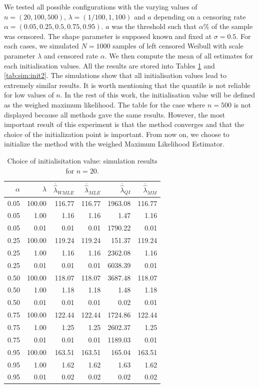 \begin{appendices}
     We tested all possible configurations with the varying values of $n = (20,100,500)$, $\lambda = (1/100,1,100)$ and $a$ depending on a censoring rate $\alpha = (0.05,0.25,0.5,0.75,0.95)$. $a$ was the threshold such that $\alpha \%$ of the sample was censored. The shape parameter is supposed known and fixed at $\sigma = 0.5$. For each cases, we simulated $N = 1000$ samples of left censored Weibull with scale parameter $\lambda$ and censored rate $\alpha$. We then compute the mean of all estimates for each initialisation values. All the results are stored into Tables \ref{tab:sim:init1} and \ref{tab:sim:init2}. The simulations show that all initialisation values lead to extremely similar results. It is worth mentioning that the quantile is not reliable for low values of $n$. In the rest of this work, the initialisation value will be defined as the weighed maximum likelihood. The table for the case where $n = 500$ is not displayed because all methods gave the same results. However, the most important result of this experiment is that the method converges and that the choice of the initialization point is important. From now on, we choose to initialize the method with the weighed Maximum Likelihood Estimator. 

\begin{table}[ht] 
\centering
\begin{tabular}{|rr||rrrr|}
 \hline
 $\alpha$ & $\lambda$ & $\overline{\hat\lambda}_{WMLE}$ & $\overline{\hat\lambda}_{MLE}$ & $\overline{\hat\lambda}_{QI}$ & $\overline{\hat\lambda}_{MM}$ \\
  \hline
  \hline
 0.05 & 100.00 & 116.77 & 116.77 & 1963.08 & 116.77 \\ 
   0.05 & 1.00 & 1.16 & 1.16 & 1.47 & 1.16 \\ 
   0.05 & 0.01 & 0.01 & 0.01 & 1790.22 & 0.01 \\ 
   0.25 & 100.00 & 119.24 & 119.24 & 151.37 & 119.24 \\ 
   0.25 & 1.00 & 1.16 & 1.16 & 2362.08 & 1.16 \\ 
   0.25 & 0.01 & 0.01 & 0.01 & 6038.39 & 0.01 \\ 
   0.50 & 100.00 & 118.07 & 118.07 & 3687.48 & 118.07 \\ 
   0.50 & 1.00 & 1.18 & 1.18 & 1.48 & 1.18 \\ 
   0.50 & 0.01 & 0.01 & 0.01 & 0.02 & 0.01 \\ 
   0.75 & 100.00 & 122.44 & 122.44 & 1724.86 & 122.44 \\ 
   0.75 & 1.00 & 1.25 & 1.25 & 2602.37 & 1.25 \\ 
   0.75 & 0.01 & 0.01 & 0.01 & 1189.03 & 0.01 \\ 
   0.95 & 100.00 & 163.51 & 163.51 & 165.04 & 163.51 \\ 
   0.95 & 1.00 & 1.62 & 1.62 & 1.63 & 1.62 \\ 
   0.95 & 0.01 & 0.02 & 0.02 & 0.02 & 0.02 \\ 
   \hline
\end{tabular}
\caption{Choice of initialisitation value: simulation results for $n = 20$.}\label{tab:sim:init1}
\end{table}


\end{appendices}
